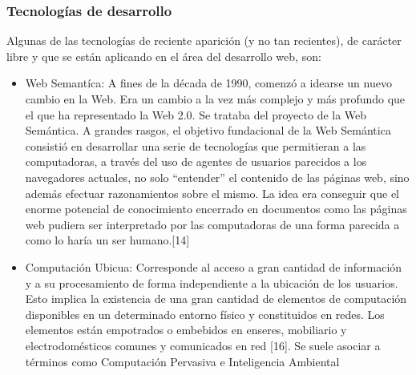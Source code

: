\subsubsection{Tecnologías de desarrollo}

Algunas de las tecnologías de reciente aparición (y no tan recientes), de carácter libre y que se están aplicando en el 
área del desarrollo web, son:

\begin{itemize}
 \item Web Semantíca: A fines de la década de 1990, comenzó a idearse un nuevo cambio en la Web. Era un cambio a 
  la vez más complejo y más profundo que el que ha representado la Web 2.0. Se trataba del proyecto de la Web
  Semántica. A grandes rasgos, el objetivo fundacional de la Web Semántica consistió en desarrollar una serie de 
  tecnologías que permitieran a las computadoras, a través del uso de agentes de usuarios parecidos a los 
  navegadores actuales, no solo “entender” el contenido de las páginas web, sino además efectuar razonamientos 
  sobre el mismo. La idea era conseguir que el enorme potencial de conocimiento encerrado en documentos como 
  las páginas web pudiera ser interpretado por las computadoras de una forma parecida a como lo haría 
  un ser humano.[14]\\
  
 \item Computación Ubicua: Corresponde al acceso a gran cantidad de información y a su procesamiento de 
 forma independiente a  la ubicación de los usuarios. Esto implica la existencia de una gran cantidad de 
 elementos de computación disponibles en un determinado  entorno físico y constituidos en redes. Los elementos 
 están empotrados o embebidos en enseres, mobiliario y electrodomésticos comunes y  comunicados en red [16]. 
 Se suele asociar a términos como Computación Pervasiva e Inteligencia Ambiental

\end{itemize}
\newpage